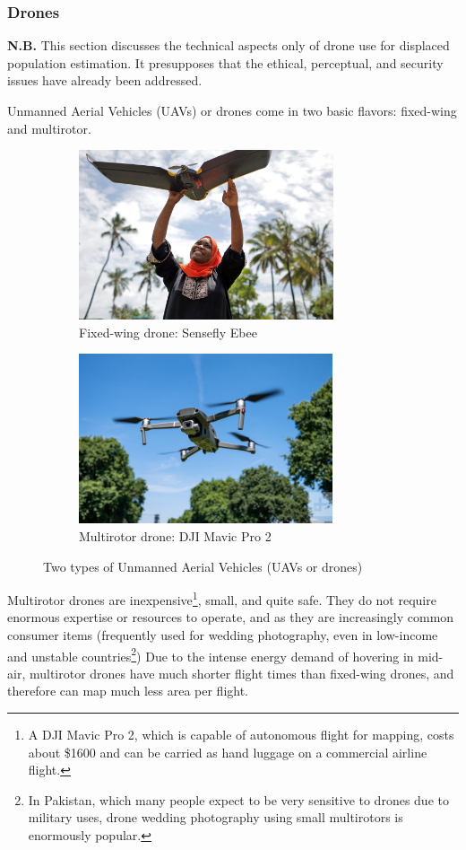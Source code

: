 \documentclass[a4paper,12pt,twoside]{article}
\begin{document}
\subsubsection{Drones}
\textbf{N.B.} This section discusses the technical aspects only of drone use for displaced population estimation. It presupposes that the ethical, perceptual, and security issues have already been addressed. 

Unmanned Aerial Vehicles (UAVs) or drones come in two basic flavors: fixed-wing and multirotor. 

\begin{figure}[H]
\begin{subfigure}{0.5\textwidth}
\includegraphics[width=0.9\linewidth, height=5cm]{images/Zanzibar_ebee.jpg} 
\caption{Fixed-wing drone: Sensefly Ebee}
\label{fig:subim1}
\end{subfigure}
\begin{subfigure}{0.5\textwidth}
\includegraphics[width=0.9\linewidth, height=5cm]{images/dji-mavic-2-pro.jpg}
\caption{Multirotor drone: DJI Mavic Pro 2}
\label{fig:subim2}
\end{subfigure}
\caption{Two types of Unmanned Aerial Vehicles (UAVs or drones)}
\label{fig:image2}
\end{figure}


Multirotor drones are inexpensive\footnote{A DJI Mavic Pro 2, which is capable of autonomous flight for mapping, costs about \$1600 and can be carried as hand luggage on a commercial airline flight.}, small, and quite safe. They do not require enormous expertise or resources to operate, and as they are increasingly common consumer items (frequently used for wedding photography, even in low-income and unstable countries\footnote{In Pakistan, which many people expect to be very sensitive to drones due to military uses, drone wedding photography using small multirotors is enormously popular.}) Due to the intense energy demand of hovering in mid-air, multirotor drones have much shorter flight times than fixed-wing drones, and therefore can map much less area per flight.
\end{document}
